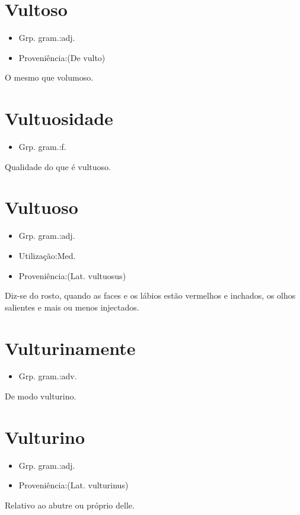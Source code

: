 \documentclass{article}
\begin{document}
\section{Vultoso}
\begin{itemize}
\item {Grp. gram.:adj.}
\end{itemize}
\begin{itemize}
\item {Proveniência:(De \textunderscore vulto\textunderscore )}
\end{itemize}
O mesmo que \textunderscore volumoso\textunderscore .
\section{Vultuosidade}
\begin{itemize}
\item {Grp. gram.:f.}
\end{itemize}
Qualidade do que é vultuoso.
\section{Vultuoso}
\begin{itemize}
\item {Grp. gram.:adj.}
\end{itemize}
\begin{itemize}
\item {Utilização:Med.}
\end{itemize}
\begin{itemize}
\item {Proveniência:(Lat. \textunderscore vultuosus\textunderscore )}
\end{itemize}
Diz-se do rosto, quando as faces e os lábios estão vermelhos e inchados, os olhos salientes e mais ou menos injectados.
\section{Vulturinamente}
\begin{itemize}
\item {Grp. gram.:adv.}
\end{itemize}
De modo vulturino.
\section{Vulturino}
\begin{itemize}
\item {Grp. gram.:adj.}
\end{itemize}
\begin{itemize}
\item {Proveniência:(Lat. \textunderscore vulturinus\textunderscore )}
\end{itemize}
Relativo ao abutre ou próprio delle.
\end{document}
